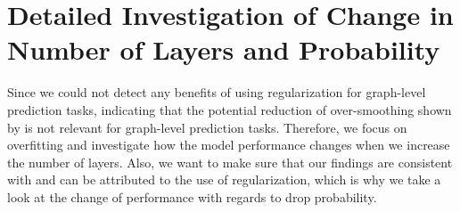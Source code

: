 \newcommand*{\addstd}[4]{
    \addplot[name path=#3upper, draw=none] table[x=#2, y expr=\thisrow{#3Avg}+\thisrow{#3Std}, col sep=semicolon] {#1};
    \addplot[name path=#3lower, draw=none] table[x=#2, y expr=\thisrow{#3Avg}-\thisrow{#3Std}, col sep=semicolon] {#1};
    \addplot[fill=#4, fill opacity=0.1] fill between[of=#3upper and #3lower];
}
\newcommand*{\layerplot}[6]{\begin{tikzpicture}
        \begin{axis}[
                width=0.8\linewidth,
                height=6cm,
                xlabel={#3},
                ylabel={#4},
                xtick={#5}, %
                ytick distance={#6}, %
                legend pos=outer north east,
                legend style={nodes={scale=0.6, transform shape}},
                grid=major,
            ]

            \addplot[color= p_red] table [x=#2, y=noneAvg, col sep=semicolon] {#1};
            \addlegendentry{No Regularization}

            \addplot[color= p_green] table [x=#2, y=dropoutAvg, col sep=semicolon] {#1};
            \addlegendentry{Dropout}

            \addplot[color= p_blue] table [x=#2, y=nodesamplingAvg, col sep=semicolon] {#1};
            \addlegendentry{Node Sampling}

            \addplot[color= p_yellow] table [x=#2, y=dropedgeAvg, col sep=semicolon] {#1};
            \addlegendentry{DropEdge}

            \addplot[color= p_violet] table [x=#2, y=gdcAvg, col sep=semicolon] {#1};
            \addlegendentry{GDC}

            \addstd{#1}{#2}{none}{p_red}
            \addstd{#1}{#2}{dropout}{p_green}
            \addstd{#1}{#2}{nodesampling}{p_blue}
            \addstd{#1}{#2}{dropedge}{p_yellow}
            \addstd{#1}{#2}{gdc}{p_violet}
        \end{axis}
    \end{tikzpicture}}


\section{Detailed Investigation of Change in Number of Layers and Probability}
Since we could not detect any benefits of using regularization for graph-level prediction tasks, indicating that the potential reduction of over-smoothing shown by \citep{Hasanzadeh2020} is not relevant for graph-level prediction tasks.
Therefore, we focus on overfitting and investigate how the model performance changes when we increase the number of layers.
Also, we want to make sure that our findings are consistent with and can be attributed to the use of regularization, which is why we take a look at the change of performance with regards to drop probability.

